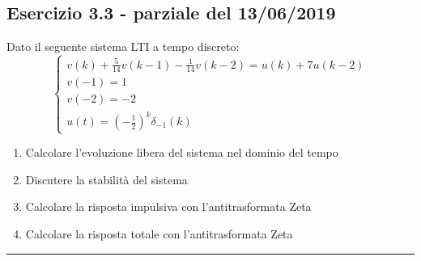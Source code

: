 \documentclass[12pt,a4paper]{article}
\begin{document}
	\subsection*{Esercizio 3.3 - parziale del 13/06/2019} Dato il seguente sistema LTI a tempo discreto:
	\[
		\begin{cases}
		v(k) + \frac{5}{14}v(k-1) -\frac{1}{14}v(k-2) = u(k) + 7u(k-2) \\
		v(-1) = 1 \\
		v(-2) = -2 \\
		u(t) = \left(-\frac{1}{2}\right)^k\delta_{-1}(k)
		\end{cases}
	\]
	\begin{enumerate}
		\item Calcolare l'evoluzione libera del sistema nel dominio del tempo
		\item Discutere la stabilit\`a del sistema
		\item Calcolare la risposta impulsiva con l'antitrasformata Zeta
		\item Calcolare la risposta totale con l'antitrasformata Zeta
	\end{enumerate}
	\par\noindent\rule{\textwidth}{0.4pt}
\end{document}
